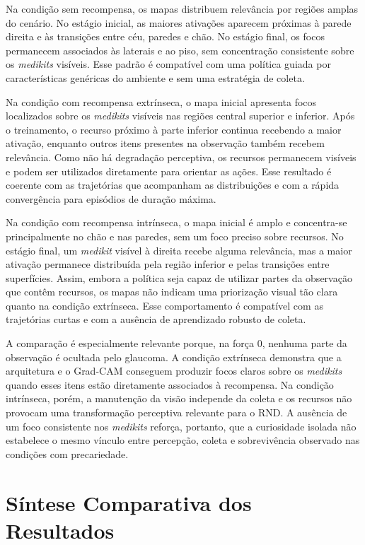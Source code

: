 Na condição sem recompensa, os mapas distribuem relevância por regiões amplas do cenário. No estágio inicial, as maiores ativações aparecem próximas à parede direita e às transições entre céu, paredes e chão. No estágio final, os focos permanecem associados às laterais e ao piso, sem concentração consistente sobre os \textit{medikits} visíveis. Esse padrão é compatível com uma política guiada por características genéricas do ambiente e sem uma estratégia de coleta.

Na condição com recompensa extrínseca, o mapa inicial apresenta focos localizados sobre os \textit{medikits} visíveis nas regiões central superior e inferior. Após o treinamento, o recurso próximo à parte inferior continua recebendo a maior ativação, enquanto outros itens presentes na observação também recebem relevância. Como não há degradação perceptiva, os recursos permanecem visíveis e podem ser utilizados diretamente para orientar as ações. Esse resultado é coerente com as trajetórias que acompanham as distribuições e com a rápida convergência para episódios de duração máxima.

Na condição com recompensa intrínseca, o mapa inicial é amplo e concentra-se principalmente no chão e nas paredes, sem um foco preciso sobre recursos. No estágio final, um \textit{medikit} visível à direita recebe alguma relevância, mas a maior ativação permanece distribuída pela região inferior e pelas transições entre superfícies. Assim, embora a política seja capaz de utilizar partes da observação que contêm recursos, os mapas não indicam uma priorização visual tão clara quanto na condição extrínseca. Esse comportamento é compatível com as trajetórias curtas e com a ausência de aprendizado robusto de coleta.

A comparação é especialmente relevante porque, na força $0$, nenhuma parte da observação é ocultada pelo glaucoma. A condição extrínseca demonstra que a arquitetura e o Grad-CAM conseguem produzir focos claros sobre os \textit{medikits} quando esses itens estão diretamente associados à recompensa. Na condição intrínseca, porém, a manutenção da visão independe da coleta e os recursos não provocam uma transformação perceptiva relevante para o RND. A ausência de um foco consistente nos \textit{medikits} reforça, portanto, que a curiosidade isolada não estabelece o mesmo vínculo entre percepção, coleta e sobrevivência observado nas condições com precariedade.

\section{Síntese Comparativa dos Resultados}

